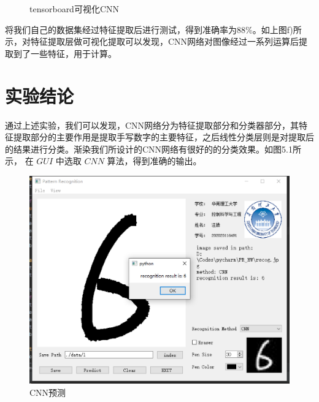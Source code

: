 \documentclass[UTF8, a4paper, 12pt]{report}
\begin{document}
\begin{figure}[!h]
{		}
		\quad
		\quad
		\caption{tensorboard可视化CNN}
		\end{figure}

		将我们自己的数据集经过特征提取后进行测试，得到准确率为88\%。如上图f)所示，对特征提取层做可视化提取可以发现，CNN网络对图像经过一系列运算后提取到了一些特征，用于计算。
\clearpage

\chapter{实验结论}
	通过上述实验，我们可以发现，CNN网络分为特征提取部分和分类器部分，其特征提取部分的主要作用是提取手写数字的主要特征，之后线性分类层则是对提取后的结果进行分类。渐染我们所设计的CNN网络有很好的的分类效果。如图5.1所示， 在 $GUI$ 中选取 $CNN$ 算法，得到准确的输出。
	\begin{figure}[!h]
	\centering
	\includegraphics[scale=0.5]{./img/Predict.eps}
	\caption{CNN预测}
	\label{fig:5.1}
	\end{figure}
\end{document}

